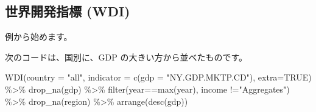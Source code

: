 \documentclass[
]{article}
\newenvironment{Shaded}{\begin{snugshade}}{\end{snugshade}}
\newcommand{\AttributeTok}[1]{\textcolor[rgb]{0.77,0.63,0.00}{#1}}
\newcommand{\ConstantTok}[1]{\textcolor[rgb]{0.00,0.00,0.00}{#1}}
\newcommand{\FunctionTok}[1]{\textcolor[rgb]{0.00,0.00,0.00}{#1}}
\newcommand{\NormalTok}[1]{#1}
\newcommand{\SpecialCharTok}[1]{\textcolor[rgb]{0.00,0.00,0.00}{#1}}
\newcommand{\StringTok}[1]{\textcolor[rgb]{0.31,0.60,0.02}{#1}}
\begin{document}
\hypertarget{ux4e16ux754cux958bux767aux6307ux6a19-wdi-1}{%
\subsection{世界開発指標
(WDI)}\label{ux4e16ux754cux958bux767aux6307ux6a19-wdi-1}}

例から始めます。

次のコードは、国別に、GDP の大きい方から並べたものです。

\begin{Shaded}
\begin{Highlighting}[]
\FunctionTok{WDI}\NormalTok{(}\AttributeTok{country =} \StringTok{"all"}\NormalTok{, }\AttributeTok{indicator =} \FunctionTok{c}\NormalTok{(}\AttributeTok{gdp =} \StringTok{"NY.GDP.MKTP.CD"}\NormalTok{),}
    \AttributeTok{extra=}\ConstantTok{TRUE}\NormalTok{) }\SpecialCharTok{\%\textgreater{}\%} \FunctionTok{drop\_na}\NormalTok{(gdp) }\SpecialCharTok{\%\textgreater{}\%}
  \FunctionTok{filter}\NormalTok{(year}\SpecialCharTok{==}\FunctionTok{max}\NormalTok{(year), income }\SpecialCharTok{!=}\StringTok{"Aggregates"}\NormalTok{) }\SpecialCharTok{\%\textgreater{}\%} 
  \FunctionTok{drop\_na}\NormalTok{(region) }\SpecialCharTok{\%\textgreater{}\%} \FunctionTok{arrange}\NormalTok{(}\FunctionTok{desc}\NormalTok{(gdp))}
\end{Highlighting}
\end{Shaded}
\end{document}

